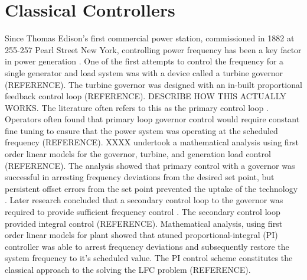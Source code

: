 \section{Classical Controllers}\label{agc}
Since Thomas Edison's first commercial power station, commissioned in 1882 at 255-257 Pearl Street New York, controlling power frequency has been a key factor in power generation \cite{Cohn1983}. One of the first attempts to control the frequency for a single generator and load system was with a device called a turbine governor (REFERENCE). The turbine governor was designed with an in-built proportional feedback control loop (REFERENCE). DESCRIBE HOW THIS ACTUALLY WORKS. The literature often refers to this as the primary control loop \cite{Bevrani2011}. Operators often found that primary loop governor control would require constant fine tuning to ensure that the power system was operating at the scheduled frequency (REFERENCE). XXXX undertook a mathematical analysis using first order linear models for the governor, turbine, and generation load control (REFERENCE). The analysis showed that primary control with a governor was successful in arresting frequency deviations from the desired set point, but persistent offset errors from the set point prevented the uptake of the technology \cite{Saadat2011}. Later research concluded that a secondary control loop to the governor was required to provide sufficient frequency control \cite{Elgerd1970}. The secondary control loop provided integral control (REFERENCE). Mathematical analysis, using first order linear models for plant showed that atuned proportional-integral (PI) controller was able to arrest frequency deviations and subsequently restore the system frequency to it's scheduled value. The PI control scheme constitutes the classical approach to the solving the LFC problem (REFERENCE).

